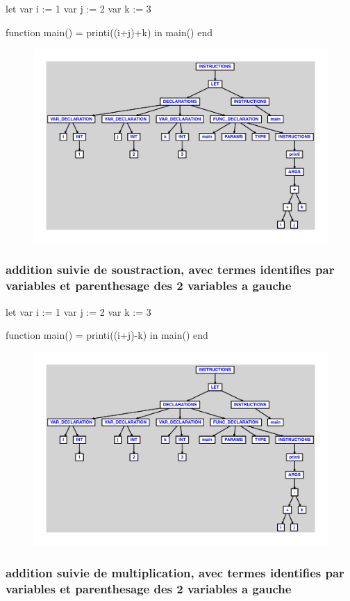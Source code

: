\documentclass{article}
\begin{document}
\begin{verbatimtab}
let
	var i := 1
	var j := 2
	var k := 3

	function main() = printi((i+j)+k)
in main() end
\end{verbatimtab}
\begin{figure}[H]\centering\includegraphics[max width=\textwidth]{ast/ast_119.pdf}\end{figure}\subsubsection{addition suivie de soustraction, avec termes identifies par variables et parenthesage des 2 variables a gauche}
\begin{verbatimtab}
let
	var i := 1
	var j := 2
	var k := 3

	function main() = printi((i+j)-k)
in main() end
\end{verbatimtab}
\begin{figure}[H]\centering\includegraphics[max width=\textwidth]{ast/ast_120.pdf}\end{figure}\subsubsection{addition suivie de multiplication, avec termes identifies par variables et parenthesage des 2 variables a gauche}
\end{document}
